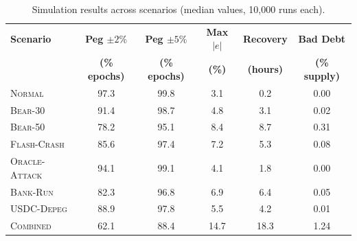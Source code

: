 \documentclass[11pt,a4paper]{article}
\begin{document}
\begin{table}[H]
\centering
\caption{Simulation results across scenarios (median values, 10{,}000 runs each).}
\label{tab:results}
\begin{tabular}{@{}lccccc@{}}
\toprule
\textbf{Scenario} & \textbf{Peg $\pm 2\%$} & \textbf{Peg $\pm 5\%$} & \textbf{Max $|e|$} & \textbf{Recovery} & \textbf{Bad Debt} \\
 & \textbf{(\% epochs)} & \textbf{(\% epochs)} & \textbf{(\%)} & \textbf{(hours)} & \textbf{(\% supply)} \\
\midrule
\textsc{Normal}      & 97.3 & 99.8 & 3.1  & 0.2 & 0.00 \\
\textsc{Bear-30}     & 91.4 & 98.7 & 4.8  & 3.1 & 0.02 \\
\textsc{Bear-50}     & 78.2 & 95.1 & 8.4  & 8.7 & 0.31 \\
\textsc{Flash-Crash}  & 85.6 & 97.4 & 7.2  & 5.3 & 0.08 \\
\textsc{Oracle-Attack} & 94.1 & 99.1 & 4.1  & 1.8 & 0.00 \\
\textsc{Bank-Run}    & 82.3 & 96.8 & 6.9  & 6.4 & 0.05 \\
\textsc{USDC-Depeg}  & 88.9 & 97.8 & 5.5  & 4.2 & 0.01 \\
\textsc{Combined}    & 62.1 & 88.4 & 14.7 & 18.3 & 1.24 \\
\bottomrule
\end{tabular}
\end{table}
\end{document}
